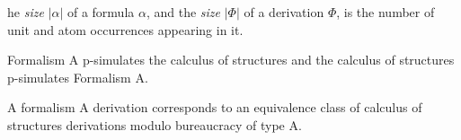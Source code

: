 \newcommand{\size}[1]{{\left\vert #1\right\vert}}\vlupdate\size
The \emph{size} $\size\alpha$ of a formula $\alpha$, and the \emph{size} $\size\Phi$ of a derivation $\Phi$, is the number of unit and atom occurrences appearing in it.

\begin{theorem}
Formalism A p-simulates the calculus of structures and the calculus of structures p-simulates Formalism A.
\end{theorem}

\begin{theorem}
A formalism A derivation corresponds to an equivalence class of calculus of structures derivations modulo bureaucracy of type A.
\end{theorem}